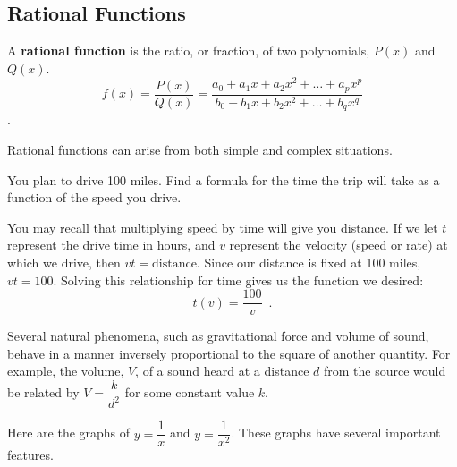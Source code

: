 \subsection{Rational Functions}
\label{ssec:rational}
\begin{definition}
  A {\bf rational function} is the ratio, or fraction, of two polynomials, \(P(x)\) and \(Q(x)\).
	\[f(x)=\dfrac{P(x)}{Q(x)}=\dfrac{a_0+a_1 x+a_2 x^2+\dots+a_p x^p}{b_0+b_1 x+b_2 x^2+\dots+b_q x^q}\].
  \end{definition}
  Rational functions can arise from both simple and complex situations.

\begin{example}
You plan to drive 100 miles. Find a formula for the time the trip will take as a function of the speed you drive.

\begin{solution} You may recall that multiplying speed by time will give you distance. If we let $t$ represent the drive time in hours, and $v$ represent the velocity (speed or rate) at which we drive, then $vt=\mbox{distance}$. Since our distance is fixed at 100 miles, $vt=100$. Solving this relationship for time gives us the function we desired:
$$t(v)=\dfrac{100}{v}\enspace .$$
\end{solution}\end{example}

Several natural phenomena, such as gravitational force and volume of sound, behave in a manner inversely proportional to the square of another quantity. For example, the volume, $V$, of a sound heard at a distance $d$ from the source would be related by $V=\dfrac{k}{d^2}$ for some constant value $k$.

Here are the graphs of $y=\dfrac{1}{x}$ and $y=\dfrac{1}{x^2}$. These graphs have several important features.

